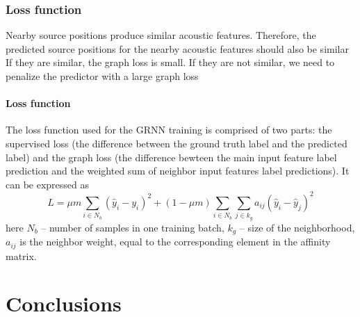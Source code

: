 \documentclass[applsci,article,submit,moreauthors,pdftex]{Definitions/mdpi}
\begin{document}
\subsubsection{Loss function}


%

Nearby source positions produce similar acoustic features. Therefore, the predicted source positions for the nearby acoustic features should also be similar
If they are similar, the graph loss is small. If they are not similar, we need to penalize the predictor with a large graph loss

\paragraph{Loss function} \label{subpg:loss}

The loss function used for the GRNN training is comprised of two parts: the supervised loss (the difference between the ground truth label and the predicted label) and the graph loss (the difference bewteen the main input feature label prediction and the weighted sum of neighbor input features label predictions). It can be expressed as 
\begin{equation}\label{eq:grnn_loss_function}
	L = \mu m \sum_{i \in N_{b}} (\hat{y}_i - y_i)^2  + (1-\mu m) \sum_{i \in N_{b}} \sum_{j \in k_g} a_{ij} (\hat{y}_i-\hat{y}_j)^2
\end{equation}
here $ N_b $ -- number of samples in one training batch, $ k_g $ -- size of the neighborhood, $ a_{ij} $ is the neighbor weight, equal to the corresponding element in the affinity matrix.

\section{Conclusions}
\end{document}
